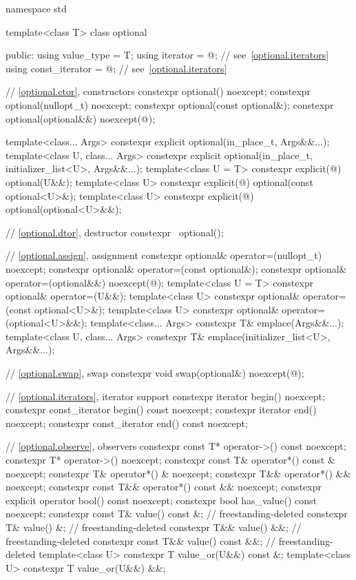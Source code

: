 %
%
\begin{codeblock}
namespace std {
  template<class T>
  class optional {
  public:
    using value_type     = T;
    using iterator       = @\impdefnc@;              // see~\ref{optional.iterators}
    using const_iterator = @\impdefnc@;              // see~\ref{optional.iterators}

    // \ref{optional.ctor}, constructors
    constexpr optional() noexcept;
    constexpr optional(nullopt_t) noexcept;
    constexpr optional(const optional&);
    constexpr optional(optional&&) noexcept(@\seebelow@);

    template<class... Args>
      constexpr explicit optional(in_place_t, Args&&...);
    template<class U, class... Args>
      constexpr explicit optional(in_place_t, initializer_list<U>, Args&&...);
    template<class U = T>
      constexpr explicit(@\seebelow@) optional(U&&);
    template<class U>
      constexpr explicit(@\seebelow@) optional(const optional<U>&);
    template<class U>
      constexpr explicit(@\seebelow@) optional(optional<U>&&);

    // \ref{optional.dtor}, destructor
    constexpr ~optional();

    // \ref{optional.assign}, assignment
    constexpr optional& operator=(nullopt_t) noexcept;
    constexpr optional& operator=(const optional&);
    constexpr optional& operator=(optional&&) noexcept(@\seebelow@);
    template<class U = T> constexpr optional& operator=(U&&);
    template<class U> constexpr optional& operator=(const optional<U>&);
    template<class U> constexpr optional& operator=(optional<U>&&);
    template<class... Args> constexpr T& emplace(Args&&...);
    template<class U, class... Args> constexpr T& emplace(initializer_list<U>, Args&&...);

    // \ref{optional.swap}, swap
    constexpr void swap(optional&) noexcept(@\seebelow@);

    // \ref{optional.iterators}, iterator support
    constexpr iterator begin() noexcept;
    constexpr const_iterator begin() const noexcept;
    constexpr iterator end() noexcept;
    constexpr const_iterator end() const noexcept;

    // \ref{optional.observe}, observers
    constexpr const T* operator->() const noexcept;
    constexpr T* operator->() noexcept;
    constexpr const T& operator*() const & noexcept;
    constexpr T& operator*() & noexcept;
    constexpr T&& operator*() && noexcept;
    constexpr const T&& operator*() const && noexcept;
    constexpr explicit operator bool() const noexcept;
    constexpr bool has_value() const noexcept;
    constexpr const T& value() const &;                                 // freestanding-deleted
    constexpr T& value() &;                                             // freestanding-deleted
    constexpr T&& value() &&;                                           // freestanding-deleted
    constexpr const T&& value() const &&;                               // freestanding-deleted
    template<class U> constexpr T value_or(U&&) const &;
    template<class U> constexpr T value_or(U&&) &&;

}}
\end{codeblock}
